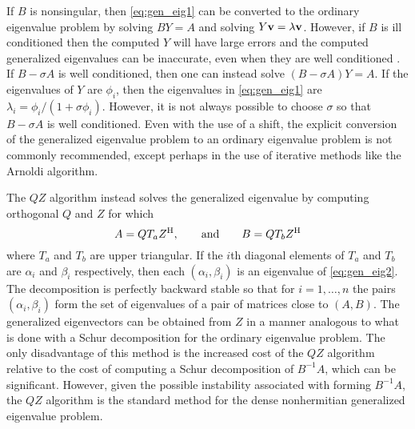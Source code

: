 \documentclass[12pt]{article}
\def\eqand{\qquad\mbox{and}\qquad}
\def\vec#1{{\bf #1}}
\def\H{{\rm H}}
\begin{document}
If $B$ is nonsingular, then \eqref{eq:gen_eig1} can be converted to
the ordinary eigenvalue problem by solving $BY = A$ and solving
$Y \vec{v} = \lambda \vec{v}$.  However, if $B$ is ill conditioned
then the computed $Y$ will have large errors and the computed
generalized eigenvalues can be inaccurate, even when they are well
conditioned \cite{govl:13, stew:01}.  If $B-\sigma A$ is well
conditioned, then one can instead solve $(B-\sigma A) Y = A$.  If the
eigenvalues of $Y$ are $\phi_i$, then the eigenvalues in
\eqref{eq:gen_eig1} are $\lambda_i = \phi_i/(1+\sigma\phi_i)$.
However, it is not always possible to choose $\sigma$ so that
$B-\sigma A$ is well conditioned.  Even with the use of a shift, the
explicit conversion of the generalized eigenvalue problem to an
ordinary eigenvalue problem is not commonly recommended, except
perhaps in the use of iterative methods like the Arnoldi algorithm.

The $QZ$ algorithm \cite{most:73} instead solves the generalized
eigenvalue by computing orthogonal $Q$ and $Z$ for which
\begin{equation*}
  A = Q T_a Z^\H, \eqand B = QT_b Z^\H
\end{equation*}
where $T_a$ and $T_b$ are upper triangular.  If the $i$th diagonal
elements of $T_a$ and $T_b$ are $\alpha_i$ and $\beta_i$ respectively,
then each $(\alpha_i, \beta_i)$ is an eigenvalue of
\eqref{eq:gen_eig2}.  The decomposition is perfectly backward stable
so that for $i=1,\ldots, n$ the pairs $(\alpha_i, \beta_i)$ form the
set of eigenvalues of a pair of matrices close to $(A,B)$.  The
generalized eigenvectors can be obtained from $Z$ in a manner
analogous to what is done with a Schur decomposition for the ordinary
eigenvalue problem.  The only disadvantage of this method is the
increased cost of the $QZ$ algorithm relative to the cost of computing
a Schur decomposition of $B^{-1}A$, which can be significant.
However, given the possible instability associated with forming
$B^{-1}A$, the $QZ$ algorithm is the standard method for the dense
nonhermitian generalized eigenvalue problem.
\end{document}
